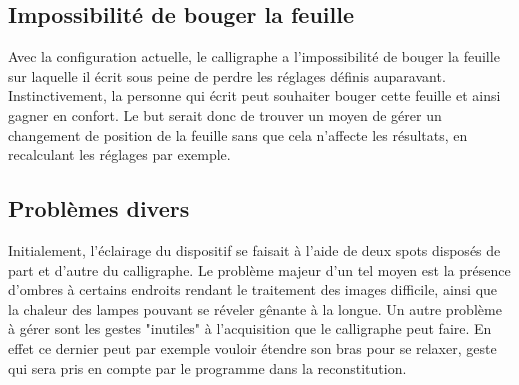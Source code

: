 \subsection{Impossibilité de bouger la feuille}

Avec la configuration actuelle, le calligraphe a l'impossibilité de bouger la feuille sur laquelle il écrit sous peine de perdre les réglages définis auparavant. Instinctivement, la personne qui écrit peut souhaiter bouger cette feuille et ainsi gagner en confort. Le but serait donc de trouver un moyen de gérer un changement de position de la feuille sans que cela n'affecte les résultats, en recalculant les réglages par exemple.

\subsection{Problèmes divers}

Initialement, l'éclairage du dispositif se faisait à l'aide de deux spots disposés de part et d'autre du calligraphe. Le problème majeur d'un tel moyen est la présence d'ombres à certains endroits rendant le traitement des images difficile, ainsi que la chaleur des lampes pouvant se réveler gênante à la longue. Un autre problème à gérer sont les gestes "inutiles" à l'acquisition que le calligraphe peut faire. En effet ce dernier peut par exemple vouloir étendre son bras pour se relaxer, geste qui sera pris en compte par le programme dans la reconstitution.